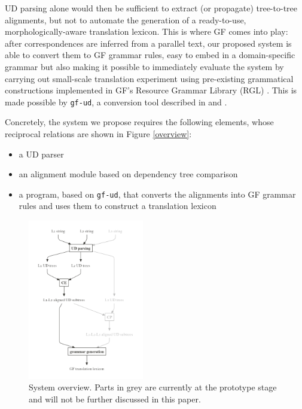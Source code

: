 \documentclass[11pt]{article}
\begin{document}
UD parsing alone would then be sufficient to extract (or propagate) tree-to-tree alignments, but not to automate the generation of a ready-to-use, morphologically-aware translation lexicon. This is where GF comes into play: after correspondences are inferred from a parallel text, our proposed system is able to convert them to GF grammar rules, easy to embed in a domain-specific grammar but also making it possible to immediately evaluate the system by carrying out small-scale translation experiment using pre-existing grammatical constructions implemented in GF's Resource Grammar Library (RGL) \cite{TODO:}. 
This is made possible by \texttt{gf-ud}, a conversion tool described in \cite{TODO:} and \cite{TODO:}.

Concretely, the system we propose requires the following elements, whose reciprocal relations are shown in Figure \ref{overview}: \smallskip

\begin{itemize}
  \item a UD parser
  \item an alignment module based on dependency tree comparison
  \item a program, based on \texttt{gf-ud}, that converts the alignments into GF grammar rules and uses them to construct a translation lexicon
\end{itemize} \smallskip

\begin{figure}[h]
  \centering
  \includegraphics[width=0.45\textwidth]{figures/overview.png}
  \caption[System overview]{System overview. Parts in grey are currently at the prototype stage and will not be further discussed in this paper.} \label{elems}
\end{figure}
\end{document}
